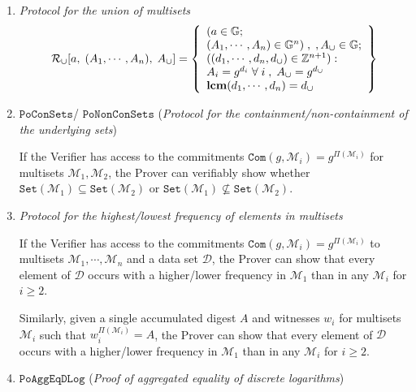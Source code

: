 \documentclass[11pt, lettersize, notitlepage, leqno, footskip=0.6cm]{article}
\newcommand{\bz}{\mathbb Z}
\newcommand{\ttt}{\texttt}
\newcommand{\sett}{\ttt{Set}}
\newcommand{\mc}{\mathcal}
\newcommand{\mb}{\mathbb}
\newcommand{\mbf}{\mathbf}
\newcommand{\sub}{\subseteq}
\newcommand{\mcM}{\mc{M}}
\newcommand{\vs}{\vspace{-0.15cm}}
\newcommand{\noin}{\noindent}
\newcommand{\LCM}{\mbf{lcm}}
\newcommand{\GCD}{\mbf{gcd}}
\numberwithin{equation}{section}
\begin{document}
{\begin{enumerate}[wide, labelwidth=!, labelindent=0pt]
\[\begin{array}{l}
  \GCD(d_1, \cdots, d_n) = d_{\tt{\cap}}
  \end{array}\right\}
\] 

\item \textit{Protocol for the union of multisets }\vs \[
  \mc{R}_{\tt{\cup}}[a,\; (A_1,\cdots,A_n),\; A_{\tt{\cup}}] = \left\{\begin{array}{l}
    (a\in\mb{G};\;\\
     (A_1,\cdots,A_n)\in \mb{G}^{n})\;,\;,A_{\tt{\cup}}\in\mb{G};\\
    ((d_1,\cdots,d_n, d_{\tt{\cup}})\in\bz^{n+1}): \\
    A_i = g^{d_i}\;\forall\;i\;,\; A_{\tt{\cup}} = g^{d_{\tt{\cup}}}   \\
    
  \LCM(d_1, \cdots, d_n) = d_{\tt{\cup}}
  \end{array}\right\}
\] 

\item $\ttt{PoConSets}$/ $\ttt{PoNonConSets}$ (\textit{Protocol for the containment/non-containment of the underlying sets})\vspace{0.05cm}

\noin If the Verifier has access to the commitments $\ttt{Com}(g, \mcM_i)= g^{\Pi(\mcM_i)}$ for multisets $\mcM_1, \mcM_2$, the Prover can verifiably show whether $\sett(\mcM_1)\sub \sett(\mcM_2)$ or $\sett(\mcM_1)\not\sub \sett(\mcM_2)$.\vspace{0.1cm}

\item \textit{Protocol for the highest/lowest frequency of elements in multisets} \vspace{0.1cm}

\noin If the Verifier has access to the commitments $\ttt{Com}(g, \mcM_i)= g^{\Pi(\mcM_i)}$ to multisets $\mcM_1,\cdots,\mcM_n$ and a data set $\mc{D}$, the Prover can show that every element of $\mc{D}$ occurs with a higher/lower frequency in $\mcM_1$ than in any $\mcM_i$ for $i\geq 2$.

\noin Similarly, given a single accumulated digest $A$ and witnesses $w_i$ for multisets $\mcM_i$ such that $w_i^{\Pi(\mcM_i)} = A $, the Prover can show that every element of $\mc{D}$ occurs with a higher/lower frequency in $\mcM_1$ than in any $\mcM_i$ for $i\geq 2$.

\item $\ttt{PoAggEqDLog}$ (\textit{Proof of aggregated equality of discrete logarithms}) \vspace{-0.3cm}


\end{enumerate}}
\end{document}
